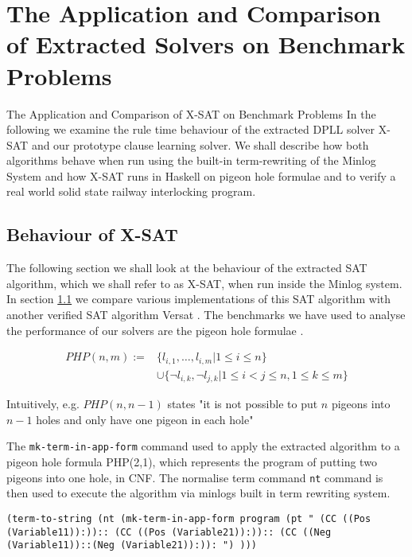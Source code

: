 \chapter{The Application and Comparison of Extracted Solvers on Benchmark Problems}{The Application and Comparison of X-SAT on Benchmark Problems} \label{chapter:dpllapp}
In the following we examine the rule time behaviour of the extracted DPLL solver X-SAT and our prototype clause learning solver. We shall describe how both algorithms behave when run using the built-in term-rewriting of the Minlog System and how X-SAT runs in Haskell on pigeon hole formulae and to verify a real world solid state railway interlocking program.



\section{Behaviour of X-SAT}
The following section we shall look at the behaviour of the extracted SAT algorithm, which we shall refer to as X-SAT, when run inside the Minlog system. In section \ref{} we compare various implementations of this SAT algorithm with another verified SAT algorithm Versat \cite{DO12}.  The benchmarks we have used to analyse the performance of our solvers are the pigeon hole formulae \cite{SC79}. 
\begin{mydef}

\begin{align*}
PHP(n,m) := &\{l_{i,1} , \ldots , l_{i,m} | 1 \leq i \leq n  \}  \\
  & \cup \{ \neg l_{i,k} , \neg l_{j,k} | 1 \leq i < j \leq n, 1 \leq k \leq m \} 
\end{align*}

\end{mydef}


Intuitively, e.g. $PHP(n,n-1)$ states "it is not possible to put $n$ pigeons into $n-1$ holes and only have one pigeon in each hole"


The \texttt{mk-term-in-app-form} command used to apply the extracted algorithm to a pigeon hole formula PHP(2,1), which represents the program of putting two pigeons into one hole, in CNF. The normalise term command \texttt{nt} command is then used to execute the algorithm via minlogs built in term rewriting system.

\begin{center}
\texttt{(term-to-string (nt (mk-term-in-app-form program (pt "                                                                                                 (CC ((Pos (Variable11)):))::                                                    
(CC ((Pos (Variable21)):))::                                                    
(CC ((Neg (Variable11))::(Neg (Variable21)):)):                                                                                                                 
") )))}
\end{center}

